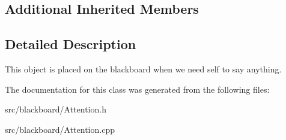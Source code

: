 \subsection*{Additional Inherited Members}


\subsection{Detailed Description}
This object is placed on the blackboard when we need self to say anything. 

The documentation for this class was generated from the following files\+:\begin{DoxyCompactItemize}
\item 
src/blackboard/Attention.\+h\item 
src/blackboard/Attention.\+cpp\end{DoxyCompactItemize}
